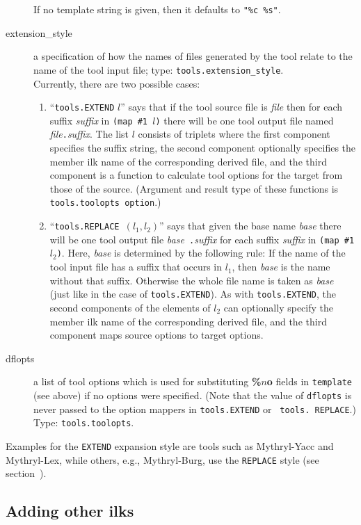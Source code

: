 \begin{description}
If no template string is given, then it defaults to {\tt "\%c \%s"}.
\item[extension_style] a specification of how the names of files
generated by the tool relate to the name of the tool input file;
type: {\tt tools.extension_style}. \\
Currently, there are two possible cases:
\begin{enumerate}
\item ``{\tt tools.EXTEND} $l$'' says that if the tool source file is
{\it file} then for each suffix {\it suffix} in {\tt (map \#1 $l$)} there
will be one tool output file named {\it file}{\tt .}{\it suffix}.  The
list $l$ consists of triplets where the first component specifies the
suffix string, the second component optionally specifies the
member ilk name of the corresponding derived file, and the
third component is a function to calculate tool options for the 
target from those of the source. (Argument and result type of these
functions is {\tt tools.toolopts option}.)
\item ``{\tt tools.REPLACE }$(l_1, l_2)$'' says that given the
base name {\it base} there will be one tool output file {\it base}{\tt
.}{\it suffix} for each suffix {\it suffix} in {\tt (map \#1 $l_2$)}.  Here,
{\it base} is determined by the following rule: If the name of the
tool input file has a suffix that occurs in $l_1$, then {\it base} is
the name without that suffix.  Otherwise the whole file name is taken
as {\it base} (just like in the case of {\tt tools.EXTEND}).  As with
{\tt tools.EXTEND}, the second components of the elements of $l_2$ can
optionally specify the member ilk name of the corresponding derived
file, and the third component maps source options to target options.
\end{enumerate}
\item[dflopts] a list of tool options which is used for
substituting {\bf \%$n$o} fields in {\tt template} (see above) if no
options were specified.  (Note that the value of {\tt dflopts} is never
passed to the option mappers in {\tt tools.EXTEND} or {\tt
tools. REPLACE}.)  Type: {\tt tools.toolopts}.
\end{description}

Examples for the {\tt EXTEND} expansion style are tools such as
Mythryl-Yacc and Mythryl-Lex, while others, e.g., Mythryl-Burg, use the {\tt REPLACE}
style (see section~).

\subsection{Adding other ilks}

